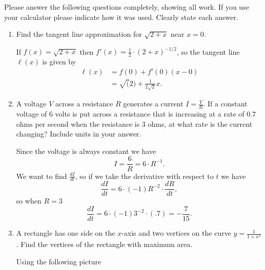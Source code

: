 \documentclass[11pt]{article}
\begin{document}
\drawtitle

\noindent Please answer the following questions completely, showing all work.
If you use your calculator please indicate how it was used.  Clearly
state each answer.

\begin{enumerate}
\item Find the tangent line approximation for $\sqrt{2 + x}$ near
  $x=0$.

  \vfill

  If $f(x)=\sqrt{2+x}$ then $f'(x)=\frac{1}{2}\cdot(2+x)^{-1/2}$, so
  the tangent line $\ell(x)$ is given by
  \begin{align*}
    \ell(x) &= f(0) + f'(0)(x - 0) \\
    &= \sqrt(2) + \frac{1}{2\sqrt{2}}x.
  \end{align*}

  \vfill

\item A voltage $V$ across a resistance $R$ generates a current
  $I=\frac{V}{R}$.  If a constant voltage of 6 volts is put across a
  resistance that is increasing at a rate of $0.7$ ohms per second
  when the resistance is 3 ohms, at what rate is the current
  changing?  Include units in your answer.

  \vfill

  Since the voltage is always constant we have
  \[
  I=\frac{6}{R}=6\cdot R^{-1}.
  \]
  We want to find $\frac{dI}{dt}$, so if we take the derivative with
  respect to $t$ we have
  \[
  \frac{dI}{dt}=6\cdot(-1)R^{-2}\cdot\frac{dR}{dt},
  \]
  so when $R=3$
  \[
  \frac{dI}{dt} = 6\cdot (-1)3^{-2}\cdot (.7) = -\frac{7}{15}.
  \]

  \vfill
  \newpage
  
\item A rectangle has one side on the $x$-axis and two vertices on the
  curve $y=\frac{1}{1 + x^2}$. Find the vertices of the rectangle with
  maximum area.

  \vfill

  Using the following picture
  \begin{center}
\end{center}
\end{enumerate}
\end{document}
